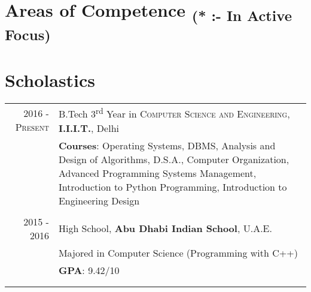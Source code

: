 \documentclass[a4paper,10pt]{article}
\begin{document}
\section{Areas of Competence \textsubscript{(\textbf{*} :- In Active Focus)}}
\begin{Parallel}{0.45\textwidth}{0.53\textwidth}
\ParallelPar
\end{Parallel}

\section{Scholastics}
\begin{tabular}{r|p{13.6cm}}
 \textsc{2016 - Present} & B.Tech 3\textsuperscript{rd} Year in \textsc{Computer Science and Engineering}, \textbf{I.I.I.T.}, Delhi\\
& \textbf{Courses}: Operating Systems, DBMS, Analysis and Design of Algorithms, D.S.A., Computer Organization, Advanced Programming
    Systems Management, Introduction to Python Programming, Introduction to Engineering Design\\\multicolumn{1}{c}{}\\
\textsc{2015 - 2016}& High School, \normalsize\textbf{Abu Dhabi Indian School}, U.A.E.\\
& Majored in Computer Science (Programming with C++) \\
&\normalsize \textbf{GPA}: 9.42/10\\&\\\multicolumn{1}{c}{}\\
\end{tabular}
\end{document}
